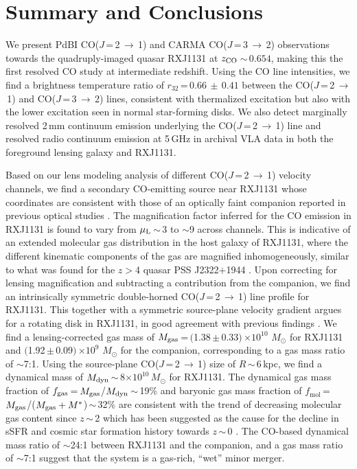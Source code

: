 \documentclass[]{emulateapj}
\newcommand{\Msun}{\mbox{$M_{\odot}$}\xspace}
\newcommand{\rarr}{$\rightarrow$}
\newcommand{\bco}{\mbox{CO($J$\,=\,2\,\rarr\,1)}\xspace}
\newcommand{\cco}{\mbox{CO($J$\,=\,3\,\rarr\,2)}\xspace}
\newcommand{\E}[1]{\mbox{$\times10^{#1}$}}
\newcommand{\eq}{\,=\,}
\newcommand{\ssim}{\,$\sim$\,}
\newcommand{\pmm}{\,$\pm$\,}
\newcommand{\SF}{star formation\xspace}
\begin{document}
\section{Summary and Conclusions} \label{sec:sum}
We present PdBI \bco and CARMA \cco observations towards the
quadruply-imaged quasar RXJ1131 at $z_{\rm CO}$\ssim$0.654$, making this the first
resolved CO study at intermediate redshift.
Using the CO line intensities, we find a brightness temperature ratio of $r_{32}$\eq$0.66\,\pm\,0.41$
between the \bco and \cco lines,
consistent with thermalized excitation but also with the lower excitation seen in normal star-forming disks.
We also detect marginally resolved
2\,mm continuum emission underlying the \bco line
and resolved radio continuum emission at 5\,GHz in archival VLA data
in both the foreground lensing galaxy and RXJ1131.

Based on our lens modeling analysis of different \bco velocity channels,
we find a secondary CO-emitting source near RXJ1131 whose coordinates
are consistent with those of an optically faint companion reported in previous optical studies
.
The magnification factor inferred for the CO emission in RXJ1131 is found to
vary from $\mu_{\rm L}$\ssim3 to $\sim$9 across channels. This is indicative of an extended molecular gas
distribution in the host galaxy of RXJ1131, where the different kinematic components
of the gas are magnified inhomogeneously, similar to what was found for the $z$$>$4 quasar
PSS J2322$+$1944 \citep{Riechers08a}.
Upon correcting for lensing magnification and subtracting a contribution from the companion,
we find an intrinsically symmetric double-horned \bco line profile for RXJ1131.
This together with a symmetric source-plane velocity gradient argues for a rotating disk in RXJ1131, in good agreement with previous findings .
We find a lensing-corrected gas mass of $M_{\rm gas}$\,=\,$($1.38\pmm0.33$)$\,\E{10} \Msun
for RXJ1131
and $($1.92\pmm0.09$)$\,\E{9} \Msun for the companion,
corresponding to a gas mass ratio of $\sim$7:1.
Using the source-plane \bco size of $R$\ssim6\,kpc, we find a dynamical mass of $M_{\rm dyn}$\ssim8\E{10}\,\Msun for RXJ1131.
The dynamical gas mass fraction of $f_{\rm gas}$\eq$M_{\rm gas}$/$M_{\rm dyn}$\ssim19\% and baryonic gas mass fraction of
$f_\textrm{mol}$\eq$M_{\rm gas}$/($M_{\rm gas} + M^*$)\ssim32\% are consistent with the trend of decreasing molecular gas
content since $z$\ssim2 \citep[e.g.,][;]{Lagos11a,Tacconi13a}
which has been suggested as the cause for the decline in sSFR and cosmic \SF history towards $z$\ssim0 \citep[e.g.,][]{Tacconi13a,CW13,Genzel15a}.
The CO-based dynamical mass ratio of $\sim$24:1
between RXJ1131 and the companion, and a gas mass ratio of $\sim$7:1
suggest that the system is a gas-rich, ``wet'' minor merger.
\end{document}
